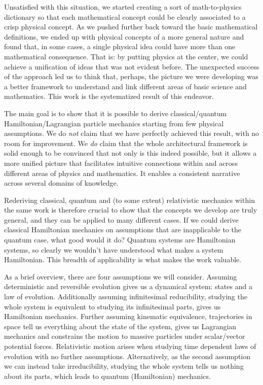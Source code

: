 \documentclass[smallextended]{svjour3}
\numberwithin{equation}{section}
\theoremstyle{definition}
\begin{document}
Unsatisfied with this situation, we started creating a sort of math-to-physics dictionary so that each mathematical concept could be clearly associated to a crisp physical concept. As we pushed further back toward the basic mathematical definitions, we ended up with physical concepts of a more general nature and found that, in some cases, a single physical idea could have more than one mathematical consequence. That is: by putting physics at the center, we could achieve a unification of ideas that was not evident before. The unexpected success of the approach led us to think that, perhaps, the picture we were developing was a better framework to understand and link different areas of basic science and mathematics. This work is the systematized result of this endeavor.


The main goal is to show that it is possible to derive classical/quantum Hamiltonian/Lagrangian particle mechanics starting from few physical assumptions. We do \emph{not} claim that we have perfectly achieved this result, with no room for improvement. We \emph{do} claim that the whole architectural framework is solid enough to be convinced that not only is this indeed possible, but it allows a more unified picture that facilitates intuitive connections within and across different areas of physics and mathematics. It enables a consistent narrative across several domains of knowledge.

Rederiving classical, quantum and (to some extent) relativistic mechanics within the same work is therefore crucial to show that the concepts we develop are truly general, and they can be applied to many different cases. If we could derive classical Hamiltonian mechanics on assumptions that are inapplicable to the quantum case, what good would it do? Quantum systems are Hamiltonian systems, so clearly we wouldn't have understood what makes a system Hamiltonian. This breadth of applicability is what makes the work valuable.

As a brief overview, there are four assumptions we will consider. Assuming deterministic and reversible evolution gives us a dynamical system: states and a law of evolution. Additionally assuming infinitesimal reducibility, studying the whole system is equivalent to studying its infinitesimal parts, gives us Hamiltonian mechanics. Further assuming kinematic equivalence, trajectories in space tell us everything about the state of the system, gives us Lagrangian mechanics and constrains the motion to massive particles under scalar/vector potential forces. Relativistic motion arises when studying time dependent laws of evolution with no further assumptions. Alternatively, as the second assumption we can instead take irreducibility, studying the whole system tells us nothing about its parts, which leads to quantum (Hamiltonian) mechanics.
\end{document}
